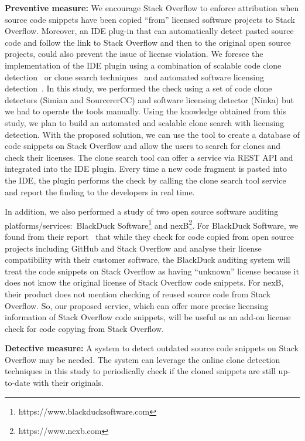\documentclass[10pt,journal,compsoc]{IEEEtran}
\begin{document}
\textbf{Preventive measure:} We encourage Stack Overflow to enforce attribution
when source code snippets have been copied ``from'' licensed software projects
to Stack Overflow. Moreover, an IDE plug-in that can automatically detect pasted
source code and follow the link to Stack Overflow and then to the original open
source projects, could also prevent the issue of license violation. We foresee
the implementation of the IDE plugin using a combination of scalable code clone
detection~\cite{Sajnani2016} or clone search techniques~\cite{Kim2018} and
automated software licensing detection~\cite{German2010}. In this study, we
performed the check using a set of code clone detectors (Simian and SourcererCC)
and software licensing detector (Ninka) but we had to operate the tools
manually. Using the knowledge obtained from this study, we plan to build an
automated and scalable clone search with licensing detection. With the proposed
solution, we can use the tool to create a database of code snippets on Stack
Overflow and allow the users to search for clones and check their licenses. The
clone search tool can offer a service via REST API and integrated into the IDE
plugin. Every time a new code fragment is pasted into the IDE, the plugin
performs the check by calling the clone search tool service and report the
finding to the developers in real time.

In addition, we also performed a study of two open source software auditing
platforms/services:~BlackDuck
Software\footnote{https://www.blackducksoftware.com} and
nexB\footnote{https://www.nexb.com}. For BlackDuck Software, we found from their
report~\cite{CORSI2017} that while they check for code copied from open source
projects including GitHub and Stack Overflow and analyse their license
compatibility with their customer software, the BlackDuck auditing system will
treat the code snippets on Stack Overflow as having ``unknown'' license because
it does not know the original license of Stack Overflow code snippets. For nexB,
their product does not mention checking of reused source code from Stack
Overflow. So, our proposed service, which can offer more precise licensing
information of Stack Overflow code snippets, will be useful as an add-on license
check for code copying from Stack Overflow.
	
\textbf{Detective measure:} A
system to detect outdated source code snippets on Stack Overflow may be needed. The
system can leverage the online clone detection techniques in this study to
periodically check if the cloned snippets are still up-to-date with their
originals. 
\end{document}
